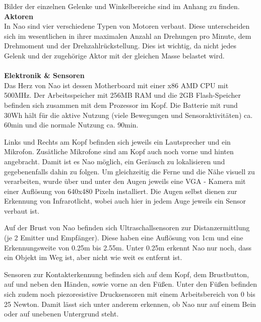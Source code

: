 Bilder der einzelnen Gelenke und Winkelbereiche sind im Anhang zu finden.
\\
\noindent
\textbf{Aktoren}
\\
In Nao sind vier verschiedene Typen von Motoren verbaut. Diese unterscheiden sich im wesentlichen in ihrer maximalen Anzahl an Drehungen pro Minute, dem Drehmoment und der Drehzahlrückstellung. Dies ist wichtig, da nicht jedes Gelenk und der zugehörige Aktor mit der gleichen Masse belastet wird.
\\
\\
\textbf{Elektronik \& Sensoren}
\\
Das Herz von Nao ist dessen Motherboard mit einer x86 AMD CPU mit 500MHz. Der Arbeitsspeicher mit 256MB RAM und die 2GB Flash-Speicher befinden sich zusammen mit dem Prozessor im Kopf.  Die Batterie mit rund 30Wh hält für die aktive Nutzung (viele Bewegungen und Sensoraktivitäten) ca. 60min und die normale Nutzung ca. 90min. 

Links und Rechts am Kopf befinden sich jeweils ein Lautsprecher und ein Mikrofon. Zusätliche Mikrofone sind am Kopf auch noch vorne und hinten angebracht. Damit ist es Nao möglich, ein Geräusch zu lokalisieren und gegebenenfalls dahin zu folgen. Um gleichzeitig die Ferne und die Nähe visuell zu verarbeiten, wurde über und unter den Augen jeweils eine VGA - Kamera mit einer Auflösung von 640x480 Pixeln installiert. Die Augen selbst dienen zur Erkennung von Infrarotlicht, wobei auch hier in jedem Auge jeweils ein Sensor verbaut ist.

Auf der Brust von Nao befinden sich Ultraschallsensoren zur Distanzermittlung (je 2 Emitter und Empfänger). Diese haben eine Auflösung von 1cm und eine Erkennungsweite von 0.25m bis 2.55m. Unter 0.25m erkennt Nao nur noch, dass ein Objekt im Weg ist, aber nicht wie weit es entfernt ist.

Sensoren zur Kontakterkennung befinden sich auf dem Kopf, dem Brustbutton, auf und neben den Händen, sowie vorne an den Füßen. Unter den Füßen befinden sich zudem noch piezoresistive Drucksensoren mit einem Arbeitsbereich von 0 bis 25 Newton. Damit lässt sich unter anderem erkennen, ob Nao nur auf einem Bein oder auf unebenen Untergrund steht.

